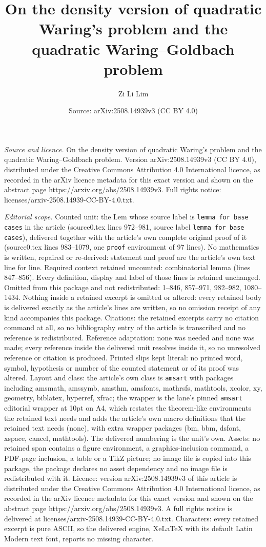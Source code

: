 \documentclass[10pt,a4paper]{amsart}
\title[On the density version of quadratic Waring's problem and the]{On the density version of quadratic Waring's problem and the quadratic Waring--Goldbach problem}
\author{Zi Li Lim}
\date{Source: arXiv:2508.14939v3 (CC BY 4.0)}
\begin{document}
\maketitle

\noindent\emph{Source and licence.} On the density version of quadratic Waring's problem and the quadratic Waring--Goldbach problem. Version arXiv:2508.14939v3 (CC BY 4.0), distributed under the Creative Commons Attribution 4.0 International licence, as recorded in the arXiv licence metadata for this exact version and shown on the abstract page https://arxiv.org/abs/2508.14939v3. Full rights notice: licenses/arxiv-2508.14939-CC-BY-4.0.txt.\par\smallskip

\noindent\textit{Editorial scope.} Counted unit: the Lem whose source label is \texttt{lemma for base cases} in the article (source0.tex lines 972--981, source label \texttt{lemma for base cases}), delivered together with the article's own complete original proof of it (source0.tex lines 983--1079, one \texttt{proof} environment of 97 lines). No mathematics is written, repaired or re-derived: statement and proof are the article's own text line for line. Required context retained uncounted: combinatorial lemma (lines 847--856). Every definition, display and label of those lines is retained unchanged. Omitted from this package and not redistributed: 1--846, 857--971, 982--982, 1080--1434. Nothing inside a retained excerpt is omitted or altered: every retained body is delivered exactly as the article's lines are written, so no omission receipt of any kind accompanies this package. Citations: the retained excerpts carry no citation command at all, so no bibliography entry of the article is transcribed and no reference is redistributed. Reference adaptation: none was needed and none was made; every reference inside the delivered unit resolves inside it, so no unresolved reference or citation is produced. Printed slips kept literal: no printed word, symbol, hypothesis or number of the counted statement or of its proof was altered. Layout and class: the article's own class is \texttt{amsart} with packages including amsmath, amssymb, amsthm, amsfonts, mathrsfs, mathtools, xcolor, xy, geometry, biblatex, hyperref, xfrac; the wrapper is the lane's pinned \texttt{amsart} editorial wrapper at 10pt on A4, which restates the theorem-like environments the retained text needs and adds the article's own macro definitions that the retained text needs (none), with extra wrapper packages (bm, bbm, dsfont, xspace, cancel, mathtools). The delivered numbering is the unit's own. Assets: no retained span contains a figure environment, a graphics-inclusion command, a PDF-page inclusion, a table or a TikZ picture; no image file is copied into this package, the package declares no asset dependency and no image file is redistributed with it. Licence: version arXiv:2508.14939v3 of this article is distributed under the Creative Commons Attribution 4.0 International licence, as recorded in the arXiv licence metadata for this exact version and shown on the abstract page https://arxiv.org/abs/2508.14939v3. A full rights notice is delivered at licenses/arxiv-2508.14939-CC-BY-4.0.txt. Characters: every retained excerpt is pure ASCII, so the delivered engine, XeLaTeX with its default Latin Modern text font, reports no missing character.
\end{document}
